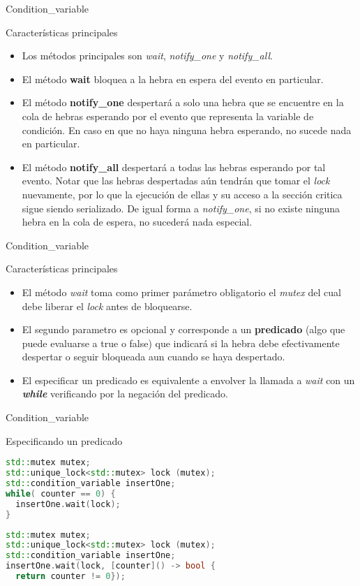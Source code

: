 \begin{frame}[fragile]{Condition\_variable}
\begin{block}{Características principales}
\begin{itemize}
  \item Los métodos principales son \textit{wait}, \textit{notify\_one} y \textit{notify\_all}.
  \item El método \textbf{wait} bloquea a la hebra en espera del evento en particular.
  \item El método \textbf{notify\_one} despertará a solo una hebra que se encuentre en la cola de hebras esperando por el evento que representa la variable de condición. En caso en que no haya ninguna hebra esperando, no sucede nada en particular.
  \item El método \textbf{notify\_all} despertará a todas las hebras esperando por tal evento. Notar que las hebras despertadas aún tendrán que tomar el \textit{lock} nuevamente, por lo que la ejecución de ellas y su acceso a la sección critica sigue siendo serializado. De igual forma a \textit{notify\_one}, si no existe ninguna hebra en la cola de espera, no sucederá nada especial.
\end{itemize}
\end{block}
\end{frame}

\begin{frame}[fragile]{Condition\_variable}
\begin{block}{Características principales}
\begin{itemize}
  \item El método \textit{wait} toma como primer parámetro obligatorio el \textit{mutex} del cual debe liberar el \textit{lock} antes de bloquearse.
  \item El segundo parametro es opcional y corresponde a un \textbf{predicado} (algo que puede evaluarse a true o false) que indicará si la hebra debe efectivamente despertar o seguir bloqueada aun cuando se haya despertado.
  \item El especificar un predicado es equivalente a envolver la llamada a \textit{wait} con un \textbf{\textit{while}} verificando por la negación del predicado.
\end{itemize}
\end{block}
\end{frame}

\begin{frame}[fragile]{Condition\_variable}
\begin{block}{Especificando un predicado}
\begin{lstlisting}[language=C++, basicstyle=\small]
std::mutex mutex;
std::unique_lock<std::mutex> lock (mutex);
std::condition_variable insertOne;
while( counter == 0) {
  insertOne.wait(lock);
}
\end{lstlisting}
\begin{lstlisting}[language=C++, basicstyle=\small]
std::mutex mutex;
std::unique_lock<std::mutex> lock (mutex);
std::condition_variable insertOne;
insertOne.wait(lock, [counter]() -> bool {
  return counter != 0});
\end{lstlisting}
\end{block}
\end{frame}

